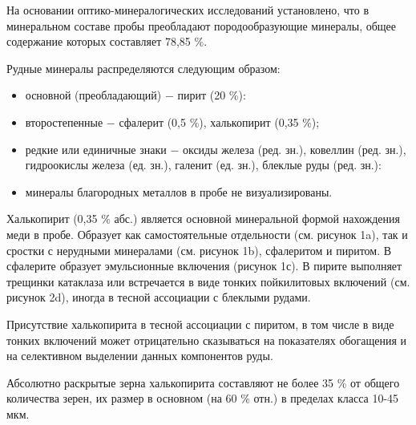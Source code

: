 На основании оптико-минералогических исследований установлено, что в
минеральном составе пробы преобладают породообразующие минералы, общее
содержание которых составляет 78,85 \%.

Рудные минералы распределяются следующим образом:

\begin{itemize}
\item
  основной (преобладающий) − пирит (20 \%):
\item
  второстепенные − сфалерит (0,5 \%), халькопирит (0,35 \%);
\item
  редкие или единичные знаки − оксиды железа (ред. зн.), ковеллин (ред.
  зн.), гидроокислы железа (ед. зн.), галенит (ед. зн.), блеклые руды
  (ред. зн.):
\item
  минералы благородных металлов в пробе не визуализированы.
\end{itemize}

Халькопирит (0,35 \% абс.) является основной минеральной формой
нахождения меди в пробе. Образует как самостоятельные отдельности (см.
рисунок 1a), так и сростки с нерудными минералами (см. рисунок 1b),
сфалеритом и пиритом. В сфалерите образует эмульсионные включения
(рисунок 1с). В пирите выполняет трещинки катаклаза или встречается в
виде тонких пойкилитовых включений (см. рисунок 2d), иногда в тесной
ассоциации с блеклыми рудами.

Присутствие халькопирита в тесной ассоциации с пиритом, в том числе в
виде тонких включений может отрицательно сказываться на показателях
обогащения и на селективном выделении данных компонентов руды.

Абсолютно раскрытые зерна халькопирита составляют не более 35 \% от
общего количества зерен, их размер в основном (на 60 \% отн.) в пределах
класса 10-45 мкм.

